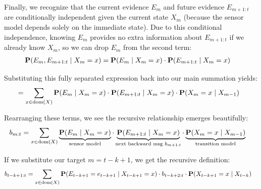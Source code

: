 Finally, we recognize that the current evidence $E_m$ and future evidence $E_{m+1:t}$ are conditionally independent given the current state $X_m$ (because the sensor model depends solely on the immediate state). Due to this conditional independence, knowing $E_m$ provides no extra information about $E_{m+1:t}$ if we already know $X_m$, so we can drop $E_m$ from the second term:
\begin{align*}
\textbf{P}(E_m, E_{m+1:t} \mid X_m = x) &= \textbf{P}(E_m \mid X_m = x) \cdot \textbf{P}(E_{m+1:t} \mid X_m = x)
\end{align*}

Substituting this fully separated expression back into our main summation yields:
\begin{align*}
&= \sum_{x \in \text{dom}(X)} \textbf{P}(E_m \mid X_m = x) \cdot \textbf{P}(E_{m+1:t} \mid X_m = x) \cdot \textbf{P}(X_m = x \mid X_{m-1})
\end{align*}

Rearranging these terms, we see the recursive relationship emerges beautifully:
\begin{align*}
b_{m:t} &= \sum_{x \in \text{dom}(X)} \underbrace{\textbf{P}(E_m \mid X_m = x)}_{\text{sensor model}} \cdot \underbrace{\textbf{P}(E_{m+1:t} \mid X_m = x)}_{\text{next backward msg } b_{m+1:t}} \cdot \underbrace{\textbf{P}(X_m = x \mid X_{m-1})}_{\text{transition model}}
\end{align*}

If we substitute our target $m = t-k+1$, we get the recursive definition:
\begin{align*}
b_{t-k+1:t} &= \sum_{x \in \text{dom}(X)} \textbf{P}(E_{t-k+1} = e_{t-k+1} \mid X_{t-k+1}=x) \cdot b_{t-k+2:t} \cdot \textbf{P}(X_{t-k+1} = x \mid X_{t-k})
\end{align*}




